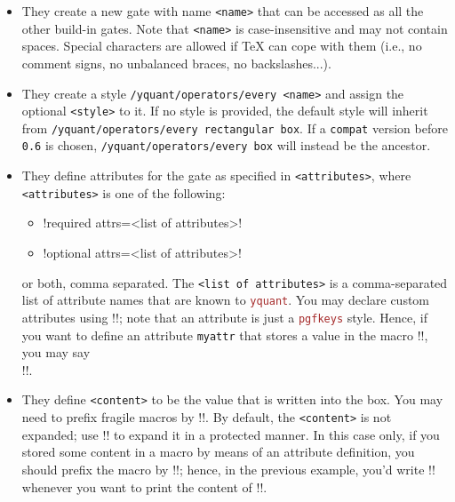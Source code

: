 \documentclass{scrartcl}
\def\pkg#1{\textcolor{brown}{\texttt{#1}}}
\def\ttlink{\link\texttt}
\def\Yquant{\pkg{yquant}}
\begin{document}
         \begin{itemize}
            \item They create a new gate with name \texttt{<name>} that can be accessed as all the other build\hyp in gates.
               Note that \texttt{<name>} is case\hyp insensitive and may not contain spaces.
               Special characters are allowed if \TeX{} can cope with them (i.e., no comment signs, no unbalanced braces, no backslashes...).
            \item They create a style \texttt{/yquant/operators/every <name>} and assign the optional \texttt{<style>} to it.
               If no style is provided, the default style will inherit from \ttlink{/yquant/operators/every rectangular box}.
               If a \ttlink{compat} version before \texttt{0.6} is chosen, \ttlink{/yquant/operators/every box} will instead be the ancestor.
            \item {}They define attributes for the gate as specified in \texttt{<attributes>}, where \texttt{<attributes>} is one of the following:
               \begin{itemize}
                  \item {}\tex!required attrs={<list of attributes>}!
                  \item {}\tex!optional attrs={<list of attributes>}!
               \end{itemize}
               or both, comma separated.
               The \texttt{<list of attributes>} is a comma\hyp separated list of attribute names that are known to \Yquant.
               \linkdef\yquantdeclareattr
               You may declare custom attributes using \tex!\yquantdeclareattr!; note that an attribute is just a \pkg{pgfkeys} style.
               Hence, if you want to define an attribute \texttt{myattr} that stores a value in the macro \tex!\myattr!, you may say\\\tex!!.
            \item They define \texttt{<content>} to be the value that is written into the box.
               You may need to prefix fragile macros by \tex!\protect!.
               \linkdef\yquantedefinebox
               By default, the \texttt{<content>} is not expanded; use \tex!\yquantedefinebox! to expand it in a protected manner.
               In this case only, if you stored some content in a macro by means of an attribute definition, you should prefix the macro by \tex!\noexpand!; hence, in the previous example, you'd write \tex!\noexpand\myattr! whenever you want to print the content of \tex!\myattr!.


\end{itemize}
\end{document}

